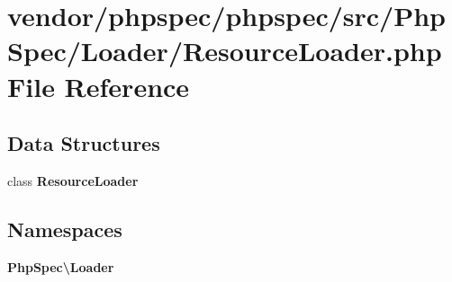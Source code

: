 \section{vendor/phpspec/phpspec/src/\+Php\+Spec/\+Loader/\+Resource\+Loader.php File Reference}
\label{_resource_loader_8php}
\subsection*{Data Structures}
\begin{DoxyCompactItemize}
\item 
class {\bf Resource\+Loader}
\end{DoxyCompactItemize}
\subsection*{Namespaces}
\begin{DoxyCompactItemize}
\item 
 {\bf Php\+Spec\textbackslash{}\+Loader}
\end{DoxyCompactItemize}

